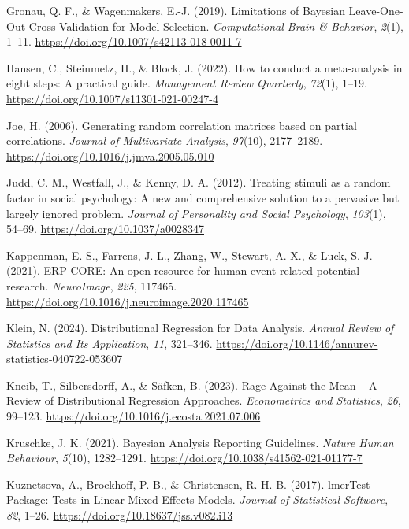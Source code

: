 \documentclass[
  doc,12pt,floatsintext]{apa7}
\newlength{\cslhangindent}
\newenvironment{CSLReferences}[2] %
 {\begin{list}{}{%
  \setlength{\itemindent}{0pt}
  \setlength{\leftmargin}{0pt}
  \setlength{\parsep}{0pt}
  \ifodd #1
   \setlength{\leftmargin}{\cslhangindent}
   \setlength{\itemindent}{-1\cslhangindent}
  \fi
  \setlength{\itemsep}{#2\baselineskip}}}
 {\end{list}}
\begin{document}
\begin{CSLReferences}{1}{0}
Gronau, Q. F., \& Wagenmakers, E.-J. (2019). Limitations of {Bayesian Leave-One-Out Cross-Validation} for {Model Selection}. \emph{Computational Brain \& Behavior}, \emph{2}(1), 1--11. \url{https://doi.org/10.1007/s42113-018-0011-7}

Hansen, C., Steinmetz, H., \& Block, J. (2022). How to conduct a meta-analysis in eight steps: A practical guide. \emph{Management Review Quarterly}, \emph{72}(1), 1--19. \url{https://doi.org/10.1007/s11301-021-00247-4}

Joe, H. (2006). Generating random correlation matrices based on partial correlations. \emph{Journal of Multivariate Analysis}, \emph{97}(10), 2177--2189. \url{https://doi.org/10.1016/j.jmva.2005.05.010}

Judd, C. M., Westfall, J., \& Kenny, D. A. (2012). Treating stimuli as a random factor in social psychology: A new and comprehensive solution to a pervasive but largely ignored problem. \emph{Journal of Personality and Social Psychology}, \emph{103}(1), 54--69. \url{https://doi.org/10.1037/a0028347}

Kappenman, E. S., Farrens, J. L., Zhang, W., Stewart, A. X., \& Luck, S. J. (2021). {ERP CORE}: {An} open resource for human event-related potential research. \emph{NeuroImage}, \emph{225}, 117465. \url{https://doi.org/10.1016/j.neuroimage.2020.117465}

Klein, N. (2024). Distributional {Regression} for {Data Analysis}. \emph{Annual Review of Statistics and Its Application}, \emph{11}, 321--346. \url{https://doi.org/10.1146/annurev-statistics-040722-053607}

Kneib, T., Silbersdorff, A., \& Säfken, B. (2023). Rage {Against} the {Mean} -- {A Review} of {Distributional Regression Approaches}. \emph{Econometrics and Statistics}, \emph{26}, 99--123. \url{https://doi.org/10.1016/j.ecosta.2021.07.006}

Kruschke, J. K. (2021). Bayesian {Analysis Reporting Guidelines}. \emph{Nature Human Behaviour}, \emph{5}(10), 1282--1291. \url{https://doi.org/10.1038/s41562-021-01177-7}

Kuznetsova, A., Brockhoff, P. B., \& Christensen, R. H. B. (2017). {lmerTest Package}: {Tests} in {Linear Mixed Effects Models}. \emph{Journal of Statistical Software}, \emph{82}, 1--26. \url{https://doi.org/10.18637/jss.v082.i13}


\end{CSLReferences}
\end{document}
